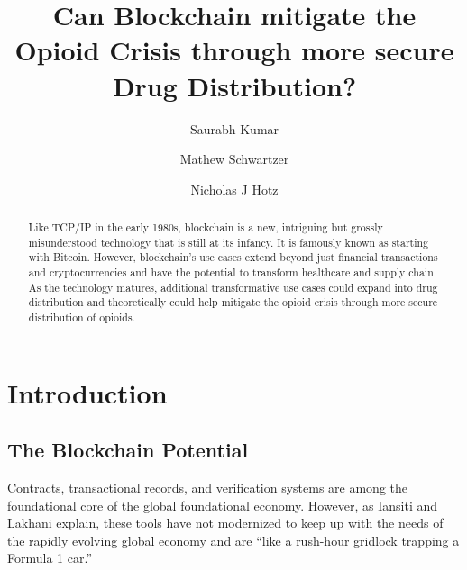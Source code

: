 \documentclass[sigconf]{acmart}
\begin{document}
\title{Can Blockchain mitigate the Opioid Crisis through more secure Drug Distribution?}


\author{Saurabh Kumar}

\author{Mathew Schwartzer}

\author{Nicholas J Hotz}


\renewcommand{\shortauthors}{G. v. Laszewski}


\begin{abstract}
Like TCP/IP in the early 1980s, blockchain is a new, intriguing but grossly misunderstood technology that is still at its infancy. It is famously known as starting with Bitcoin. However, blockchain's use cases extend beyond just financial transactions and cryptocurrencies and have the potential to transform healthcare and supply chain. As the technology matures, additional transformative use cases could expand into drug distribution and theoretically could help mitigate the opioid crisis through more secure distribution of opioids.  
\end{abstract}



\maketitle



\section{Introduction}
\subsection{The Blockchain Potential}
Contracts, transactional records, and verification systems are among the foundational core of the global foundational economy. However, as Iansiti and Lakhani \cite{hbr} explain, these tools have not modernized to keep up with the needs of the rapidly evolving global economy and are ``like a rush-hour gridlock trapping a Formula 1 car.''
\end{document}
